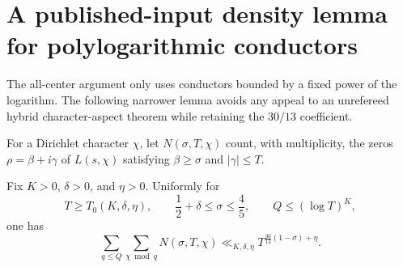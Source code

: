 \appendix
\section{A published-input density lemma for polylogarithmic conductors}
\label{app:pzd}

The all-center argument only uses conductors bounded by a fixed power of the
logarithm. The following narrower lemma avoids any appeal to an unrefereed
hybrid character-aspect theorem while retaining the $30/13$ coefficient.

For a Dirichlet character $\chi$, let $N(\sigma,T,\chi)$ count, with
multiplicity, the zeros $\rho=\beta+i\gamma$ of $L(s,\chi)$ satisfying
$\beta\ge\sigma$ and $|\gamma|\le T$.

\begin{theorem}\label{thm:pzd}
Fix $K>0$, $\delta>0$, and $\eta>0$.  Uniformly for
\[
 T\ge T_0(K,\delta,\eta),\qquad
 \frac12+\delta\le\sigma\le\frac45,
 \qquad Q\le(\log T)^K,
\]
one has
\[
 \sum_{q\le Q}\sum_{\chi\bmod q}N(\sigma,T,\chi)
 \ll_{K,\delta,\eta}
 T^{\frac{30}{13}(1-\sigma)+\eta}.
 \tag{A.1}
\]
\end{theorem}

